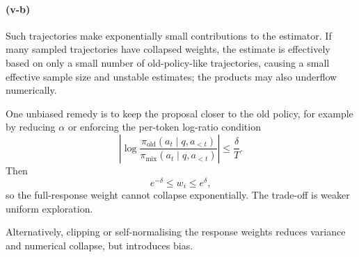 \documentclass[11pt]{article}
\begin{document}
\paragraph{(v-b)}
Such trajectories make exponentially small contributions to the estimator.
If many sampled trajectories have collapsed weights, the estimate is
effectively based on only a small number of old-policy-like trajectories,
causing a small effective sample size and unstable estimates; the products may
also underflow numerically.

One unbiased remedy is to keep the proposal closer to the old policy, for
example by reducing $\alpha$ or enforcing the per-token log-ratio condition
\[
\left|
\log
\frac{
\pi_{\mathrm{old}}(a_t\mid q,a_{<t})
}{
\pi_{\mathrm{mix}}(a_t\mid q,a_{<t})
}
\right|
\leq\frac{\delta}{T}.
\]
Then
\[
e^{-\delta}\leq w_i\leq e^\delta,
\]
so the full-response weight cannot collapse exponentially. The trade-off is
weaker uniform exploration.

Alternatively, clipping or self-normalising the response weights reduces
variance and numerical collapse, but introduces bias.
\end{document}
